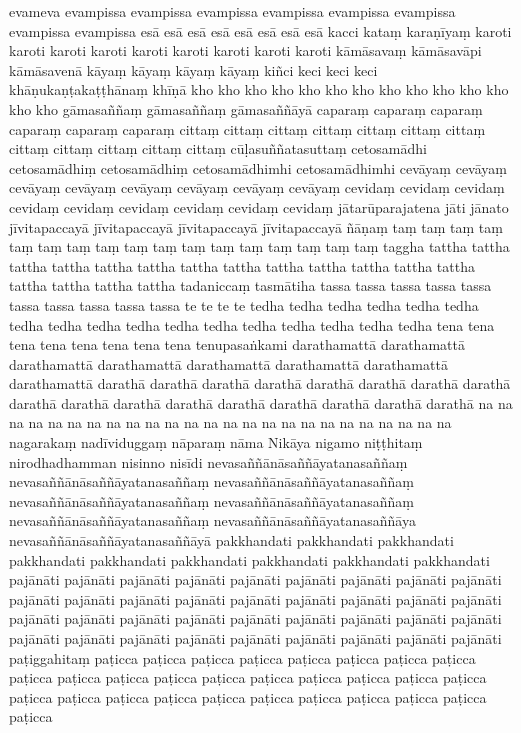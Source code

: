 \documentclass[12pt]{article}
\begin{document}
\begin{multicols}{5}
evameva
evampissa
evampissa
evampissa
evampissa
evampissa
evampissa
evampissa
evampissa
esā
esā
esā
esā
esā
esā
esā
esā
kacci
kataṃ
karaṇīyaṃ
karoti
karoti
karoti
karoti
karoti
karoti
karoti
karoti
karoti
kāmāsavaṃ
kāmāsavāpi
kāmāsavenā
kāyaṃ
kāyaṃ
kāyaṃ
kāyaṃ
kiñci
keci
keci
keci
khāṇukaṇṭakaṭṭhānaṃ
khīṇā
kho
kho
kho
kho
kho
kho
kho
kho
kho
kho
kho
kho
kho
kho
gāmasaññaṃ
gāmasaññaṃ
gāmasaññāyā
caparaṃ
caparaṃ
caparaṃ
caparaṃ
caparaṃ
caparaṃ
cittaṃ
cittaṃ
cittaṃ
cittaṃ
cittaṃ
cittaṃ
cittaṃ
cittaṃ
cittaṃ
cittaṃ
cittaṃ
cittaṃ
cūḷasuññatasuttaṃ
cetosamādhi
cetosamādhiṃ
cetosamādhiṃ
cetosamādhimhi
cetosamādhimhi
cevāyaṃ
cevāyaṃ
cevāyaṃ
cevāyaṃ
cevāyaṃ
cevāyaṃ
cevāyaṃ
cevāyaṃ
cevidaṃ
cevidaṃ
cevidaṃ
cevidaṃ
cevidaṃ
cevidaṃ
cevidaṃ
cevidaṃ
cevidaṃ
jātarūparajatena
jāti
jānato
jīvitapaccayā
jīvitapaccayā
jīvitapaccayā
jīvitapaccayā
ñāṇaṃ
taṃ
taṃ
taṃ
taṃ
taṃ
taṃ
taṃ
taṃ
taṃ
taṃ
taṃ
taṃ
taṃ
taṃ
taṃ
taṃ
taṃ
taggha
tattha
tattha
tattha
tattha
tattha
tattha
tattha
tattha
tattha
tattha
tattha
tattha
tattha
tattha
tattha
tattha
tattha
tadaniccaṃ
tasmātiha
tassa
tassa
tassa
tassa
tassa
tassa
tassa
tassa
tassa
tassa
te
te
te
te
tedha
tedha
tedha
tedha
tedha
tedha
tedha
tedha
tedha
tedha
tedha
tedha
tedha
tedha
tedha
tedha
tedha
tena
tena
tena
tena
tena
tena
tena
tena
tenupasaṅkami
darathamattā
darathamattā
darathamattā
darathamattā
darathamattā
darathamattā
darathamattā
darathamattā
darathā
darathā
darathā
darathā
darathā
darathā
darathā
darathā
darathā
darathā
darathā
darathā
darathā
darathā
darathā
darathā
darathā
na
na
na
na
na
na
na
na
na
na
na
na
na
na
na
na
na
na
na
na
na
na
na
na
na
nagarakaṃ
nadīviduggaṃ
nāparaṃ
nāma
Nikāya
nigamo
niṭṭhitaṃ
nirodhadhamman
nisinno
nisīdi
nevasaññānāsaññāyatanasaññaṃ
nevasaññānāsaññāyatanasaññaṃ
nevasaññānāsaññāyatanasaññaṃ
nevasaññānāsaññāyatanasaññaṃ
nevasaññānāsaññāyatanasaññaṃ
nevasaññānāsaññāyatanasaññaṃ
nevasaññānāsaññāyatanasaññāya
nevasaññānāsaññāyatanasaññāyā
pakkhandati
pakkhandati
pakkhandati
pakkhandati
pakkhandati
pakkhandati
pakkhandati
pakkhandati
pakkhandati
pajānāti
pajānāti
pajānāti
pajānāti
pajānāti
pajānāti
pajānāti
pajānāti
pajānāti
pajānāti
pajānāti
pajānāti
pajānāti
pajānāti
pajānāti
pajānāti
pajānāti
pajānāti
pajānāti
pajānāti
pajānāti
pajānāti
pajānāti
pajānāti
pajānāti
pajānāti
pajānāti
pajānāti
pajānāti
pajānāti
pajānāti
pajānāti
pajānāti
pajānāti
pajānāti
pajānāti
paṭiggahitaṃ
paṭicca
paṭicca
paṭicca
paṭicca
paṭicca
paṭicca
paṭicca
paṭicca
paṭicca
paṭicca
paṭicca
paṭicca
paṭicca
paṭicca
paṭicca
paṭicca
paṭicca
paṭicca
paṭicca
paṭicca
paṭicca
paṭicca
paṭicca
paṭicca
paṭicca
paṭicca
paṭicca
paṭicca
paṭicca

\end{multicols}
\end{document}
